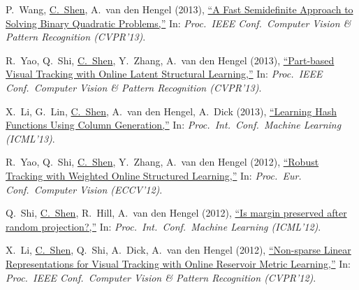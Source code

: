 \documentclass[9pt, a4paper]{article}
\newcommand{\years}[1]{\marginnote{\scriptsize #1}}
\def\highlight{\uline}
\begin{document}
\medskip

\years{2013} P.~Wang, \highlight{C.~Shen}, A.~van den Hengel (2013),
\href{http://www.google.com/search?lr=&ie=UTF-8&oe=UTF-8&q=A+Fast+Semidefinite+Approach+to+Solving+Binary+Quadratic+Problems+Peng+Wang%2C+Chunhua+Shen%2C+Anton+van+den+Hengel}{``A Fast Semidefinite Approach to Solving Binary Quadratic Problems,{}''}
In: \emph{Proc.\ IEEE Conf.\  Computer Vision \& Pattern Recognition (CVPR'13)}.

\medskip

\years{2013} R.~Yao, Q.~Shi, \highlight{C.~Shen}, Y.~Zhang, A.~van den Hengel (2013),
\href{http://www.google.com/search?lr=&ie=UTF-8&oe=UTF-8&q=Part-based+Visual+Tracking+with+Online+Latent+Structural+Learning+Rui+Yao%2C+Qinfeng+Shi%2C+Chunhua+Shen%2C+Yanning+Zhang%2C+Anton+van+den+Hengel}{``Part-based Visual Tracking with Online Latent Structural Learning,{}''}
In: \emph{Proc.\ IEEE Conf.\  Computer Vision \& Pattern Recognition (CVPR'13)}.

\medskip

\years{2013} X.~Li, G.~Lin, \highlight{C.~Shen}, A.~van den Hengel, A.~Dick (2013),
\href{http://www.google.com/search?lr=&ie=UTF-8&oe=UTF-8&q=Learning+Hash+Functions+Using+Column+Generation+Xi+Li%2C+Guosheng+Lin%2C+Chunhua+Shen%2C+Anton%0Avan+den+Hengel%2C+Anthony+Dick}{``Learning Hash Functions Using Column Generation,{}''}
In: \emph{Proc.\ Int.\ Conf.\  Machine Learning (ICML'13)}.

\medskip

\years{2012} R.~Yao, Q.~Shi, \highlight{C.~Shen}, Y.~Zhang, A.~van den Hengel (2012),
\href{http://www.google.com/search?lr=&ie=UTF-8&oe=UTF-8&q=Robust+Tracking+with+Weighted+Online+Structured+Learning+Rui+Yao%2C+Qinfeng+Shi%2C+Chunhua+Shen%2C+Yanning+Zhang%2C+Anton+van+den+Hengel}{``Robust Tracking with Weighted Online Structured Learning,{}''}
In: \emph{Proc.\ Eur. Conf.\  Computer Vision (ECCV'12)}.

\medskip

\years{2012} Q.~Shi, \highlight{C.~Shen}, R.~Hill, A.~van den Hengel (2012),
\href{http://www.google.com/search?lr=&ie=UTF-8&oe=UTF-8&q=Is+margin+preserved+after+random+projection%3F+Qinfeng+Shi%2C+Chunhua+Shen%2C+Rhys+Hill%2C+Anton+van+den+Hengel}{``Is margin preserved after random projection?,{}''}
In: \emph{Proc.\ Int.\ Conf.\  Machine Learning (ICML'12)}.

\medskip

\years{2012} X.~Li, \highlight{C.~Shen}, Q.~Shi, A.~Dick, A.~van den Hengel (2012),
\href{http://www.google.com/search?lr=&ie=UTF-8&oe=UTF-8&q=Non-sparse+Linear+Representations+for+Visual+Tracking+with+Online+Reservoir+Metric+Learning+Xi+Li%2C+Chunhua+Shen%2C+Qinfeng+Shi%2C+Anthony+Dick%2C+Anton+van+den+Hengel}{``Non-sparse Linear Representations for Visual Tracking with Online Reservoir Metric Learning,{}''}
In: \emph{Proc.\ IEEE Conf.\  Computer Vision \& Pattern Recognition (CVPR'12)}.
\end{document}
